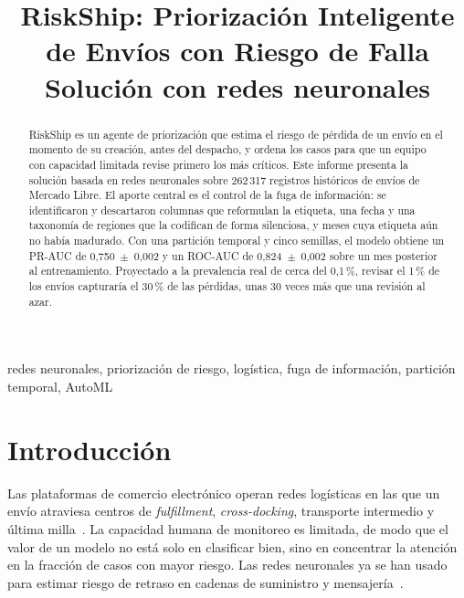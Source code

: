 \documentclass[conference]{IEEEtran}
\begin{document}
\title{RiskShip: Priorización Inteligente de Envíos con Riesgo de Falla\\
{\large Solución con redes neuronales}}

\author{
}

\maketitle

\begin{abstract}
RiskShip es un agente de priorización que estima el riesgo de pérdida de un
envío en el momento de su creación, antes del despacho, y ordena los casos para
que un equipo con capacidad limitada revise primero los más críticos. Este
informe presenta la solución basada en redes neuronales sobre 262\,317
registros históricos de envíos de Mercado Libre. El aporte central es el
control de la fuga de información: se identificaron y descartaron columnas que
reformulan la etiqueta, una fecha y una taxonomía de regiones que la codifican
de forma silenciosa, y meses cuya etiqueta aún no había madurado. Con una
partición temporal y cinco semillas, el modelo obtiene un PR-AUC de
0,750~$\pm$~0,002 y un ROC-AUC de 0,824~$\pm$~0,002 sobre un mes posterior al
entrenamiento. Proyectado a la prevalencia real de cerca del 0,1\,\%, revisar
el 1\,\% de los envíos capturaría el 30\,\% de las pérdidas, unas 30 veces más
que una revisión al azar.
\end{abstract}

\begin{IEEEkeywords}
redes neuronales, priorización de riesgo, logística, fuga de información,
partición temporal, AutoML
\end{IEEEkeywords}

\section{Introducción}

Las plataformas de comercio electrónico operan redes logísticas en las que un
envío atraviesa centros de \textit{fulfillment}, \textit{cross-docking},
transporte intermedio y última milla~\cite{meli10k}. La capacidad humana de
monitoreo es limitada, de modo que el valor de un modelo no está solo en
clasificar bien, sino en concentrar la atención en la fracción de casos con
mayor riesgo. Las redes neuronales ya se han usado para estimar riesgo de
retraso en cadenas de suministro y mensajería~\cite{bortolini,ye}.
\end{document}
